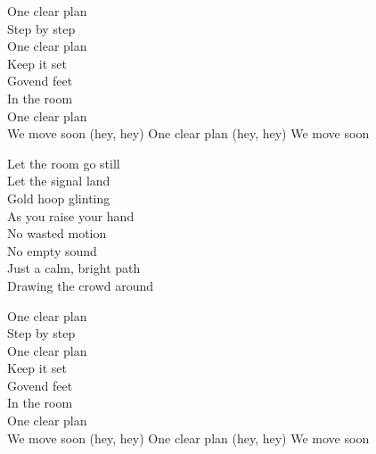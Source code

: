 \begin{lyrics}
One clear plan\\
Step by step\\
One clear plan\\
Keep it set\\
Govend feet\\
In the room\\
One clear plan\\
We move soon
(hey, hey) One clear plan
(hey, hey) We move soon

Let the room go still\\
Let the signal land\\
Gold hoop glinting\\
As you raise your hand\\
No wasted motion\\
No empty sound\\
Just a calm, bright path\\
Drawing the crowd around

One clear plan\\
Step by step\\
One clear plan\\
Keep it set\\
Govend feet\\
In the room\\
One clear plan\\
We move soon
(hey, hey) One clear plan
(hey, hey) We move soon
\end{lyrics}

